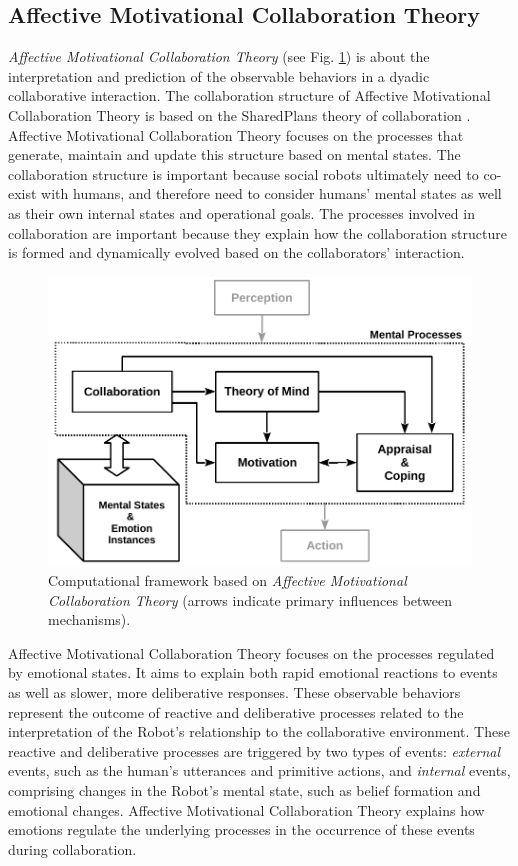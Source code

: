 \subsection{Affective Motivational Collaboration Theory}
\label{sec:AMCT}

\textit{Affective Motivational Collaboration Theory} (see Fig. \ref{fig:cpm})
is about the interpretation and prediction of the observable behaviors in a
dyadic collaborative interaction. The collaboration structure of
Affective Motivational Collaboration Theory is based on the SharedPlans theory
of collaboration
\cite{grosz:planning-acting,grosz:collaboration,grosz:plans-discourse}.
Affective Motivational Collaboration Theory focuses on the processes that
generate, maintain and update this structure based on mental states. The
collaboration structure is important because social robots ultimately need to
co-exist with humans, and therefore need to consider humans' mental states as
well as their own internal states and operational goals. The processes involved
in collaboration are important because they explain how the collaboration
structure is formed and dynamically evolved based on the collaborators'
interaction.

\begin{figure}[h!]
  \includegraphics[scale=0.78]{figure/theory-general-croped.pdf}
  \caption{Computational framework based on \textit{Affective Motivational
  Collaboration Theory} (arrows indicate primary influences between
  mechanisms).}
  \label{fig:cpm}
\end{figure}

Affective Motivational Collaboration Theory focuses on the processes regulated
by emotional states. It aims to explain both rapid emotional reactions to events
as well as slower, more deliberative responses. These observable behaviors
represent the outcome of reactive and deliberative processes related to the
interpretation of the Robot's relationship to the collaborative environment.
These reactive and deliberative processes are triggered by two types of events:
\textit{external} events, such as the human's utterances and primitive actions,
and \textit{internal} events, comprising changes in the Robot's mental state,
such as belief formation and emotional changes. Affective Motivational
Collaboration Theory explains how emotions regulate the underlying processes in
the occurrence of these events during collaboration.

